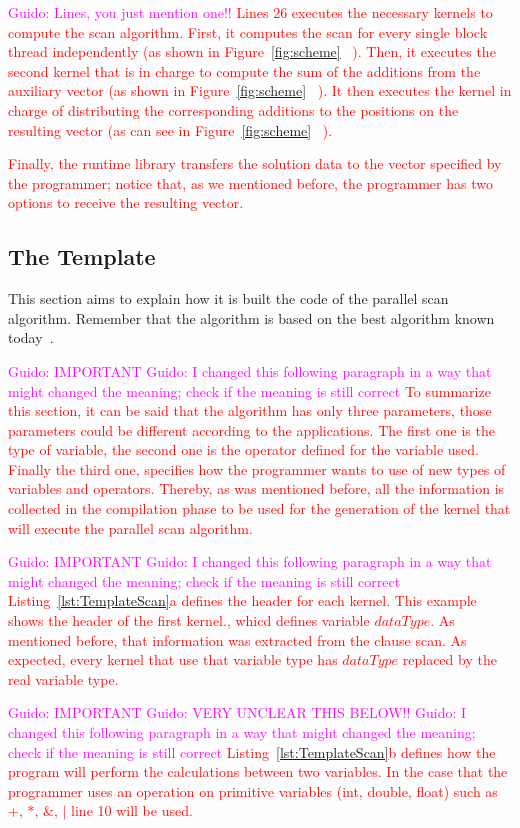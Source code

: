 \documentclass[Ingles]{ic-tese-v1}
\newcommand{\guido}[1]{\noindent\textcolor{magenta}{Guido: {#1}}}
\newcommand{\ed}[1]{\noindent\textcolor{red}{ {#1}}}
\newcommand{\guido}[1]{}
\newcommand{\ed}[1]{}
\newcommand{\rfig}[1]{Figure~\ref{fig:#1}}
\newcommand{\rlst}[1]{Listing~\ref{lst:#1}}
\begin{document}
\guido{Lines, you just mention one!!}
\ed{Lines $26$ executes the necessary kernels to compute the scan
algorithm. First, it computes the scan for every single block thread
independently (as shown in \rfig{scheme} ~\ding{182}). Then, it executes
the second kernel that is in charge to compute the sum of the additions from the
auxiliary vector (as shown in \rfig{scheme} ~\ding{184}). It then executes
the kernel in charge of distributing the corresponding additions to the
positions on the resulting vector (as can see in \rfig{scheme} ~\ding{185}).}

\ed{Finally, the runtime library transfers the solution  data to the vector
specified by the programmer; notice that, as we mentioned before, 
the programmer has two options to receive the resulting vector.}

\subsection{The Template}
\label{sec:template}

This section aims to explain how it is built the code of the parallel scan
algorithm.  Remember that the algorithm is based on the best algorithm known
today~\cite{Sengupta:2007}.

\guido{IMPORTANT}
\guido{I changed this following paragraph in a way that might changed the meaning; check if the meaning is still correct}
\ed{To summarize this section, it can be said that the algorithm has only three
parameters, those parameters could be different according to the applications.
The first one is the  type of variable, the second one is the operator defined
for the variable used. Finally the third one, specifies how the programmer 
wants to  use of new types of variables and operators.
Thereby, as was mentioned before, all the information is collected in the
compilation phase to be used for the generation of the kernel that will execute the parallel
scan algorithm.}

\guido{IMPORTANT}
\guido{I changed this following paragraph in a way that might changed the meaning; check if the meaning is still correct}
\ed{\rlst{TemplateScan}{a} defines the header for each kernel. This example shows
the header of the first kernel., whicd 
defines  variable $dataType$. As mentioned before, that information was
extracted from the clause scan. As expected, every kernel that use
that variable type has  $dataType$  replaced  by the real variable type.}

\guido{IMPORTANT}
\guido{VERY UNCLEAR THIS BELOW!!}
\guido{I changed this following paragraph in a way that might changed the meaning; check if the meaning is still correct}
\ed{\rlst{TemplateScan}{b} defines how the program will perform the calculations
between two variables. In the case that the programmer uses an operation on primitive  variables (int, double, float) such as $+$, $*$, $\&$, $|$ line 10 will be used.}
\end{document}
